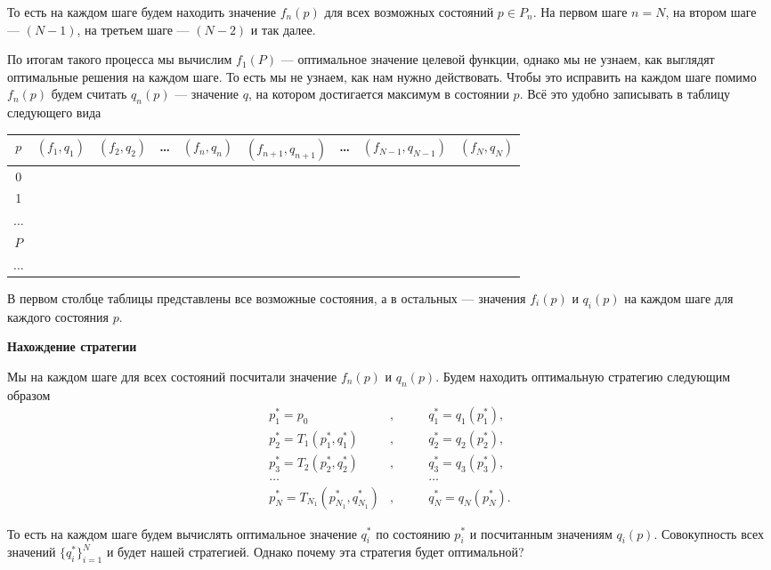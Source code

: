То есть на каждом шаге будем находить значение $f_n(p)$ для всех возможных состояний $p \in P_n$. На первом шаге $n = N$, на втором шаге --- $(N-1)$, на третьем шаге --- $(N-2)$ и так далее.

По итогам такого процесса мы вычислим $f_1(P)$ --- оптимальное значение целевой функции, однако мы не узнаем, как выглядят оптимальные решения на каждом шаге. То есть мы не узнаем, как нам нужно действовать. Чтобы это исправить на каждом шаге помимо $f_n(p)$ будем считать $q_n(p)$ --- значение $q$, на котором достигается максимум в состоянии $p$. Всё это удобно записывать в таблицу следующего вида
\begin{table}[H]
	\centering
	\begin{tabular}{ | c | c | c | c | c | c | c | c | c | } 
		\hline
		$p$ & $(f_1, q_1)$ & $(f_2, q_2)$ & \dots & $(f_n, q_n)$ & $(f_{n+1}, q_{n+1})$ & \dots & $(f_{N-1}, q_{N-1})$ & $(f_N, q_N)$ \\ 
		\hline
		0 & & & & & & & & \\\hline
		1 & & & & & & & & \\\hline
		$\dots$ & & & & & & & & \\\hline
		$P$ & & & & & & & & \\\hline
		$\dots$ & & & & & & & & \\\hline
	\end{tabular}
\end{table}

В первом столбце таблицы представлены все возможные состояния, а в остальных --- значения $f_i(p)$ и $q_i(p)$ на каждом шаге для каждого состояния $p$.

\bigskip

\textbf{Нахождение стратегии}

Мы на каждом шаге для всех состояний посчитали значение $f_n(p)$ и $q_n(p)$. Будем находить оптимальную стратегию следующим образом
\begin{align*}
	p_1^* = p_0&, \qquad &q_1^* = q_1(p_1^*), \\
	p_2^* = T_1(p_1^*, q_1^*)&, &q_2^* = q_2(p_2^*), \\
	p_3^* = T_2(p_2^*, q_2^*)&, &q_3^* = q_3(p_3^*), \\
	\dots& &\dots \\
	p_N^* = T_{N_1}(p_{N_1}^*, q_{N_1}^*)&, &q_N^* = q_N(p_N^*).
\end{align*}

То есть на каждом шаге будем вычислять оптимальное значение $q_i^*$ по состоянию $p_i^*$ и посчитанным значениям $q_i(p)$. Совокупность всех значений $\{q_i^*\}_{i=1}^{N}$ и будет нашей стратегией. Однако почему эта стратегия будет оптимальной?

